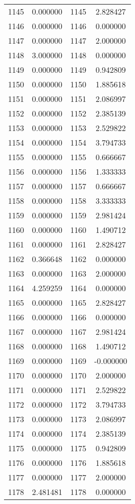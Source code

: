 \documentclass[12pt]{article}
\begin{document}
\begin{longtable}{@{}cccc@{}}
1145 & 0.000000 & 1145 & 2.828427 \\
1146 & 0.000000 & 1146 & 0.000000 \\
1147 & 0.000000 & 1147 & 2.000000 \\
1148 & 3.000000 & 1148 & 0.000000 \\
1149 & 0.000000 & 1149 & 0.942809 \\
1150 & 0.000000 & 1150 & 1.885618 \\
1151 & 0.000000 & 1151 & 2.086997 \\
1152 & 0.000000 & 1152 & 2.385139 \\
1153 & 0.000000 & 1153 & 2.529822 \\
1154 & 0.000000 & 1154 & 3.794733 \\
1155 & 0.000000 & 1155 & 0.666667 \\
1156 & 0.000000 & 1156 & 1.333333 \\
1157 & 0.000000 & 1157 & 0.666667 \\
1158 & 0.000000 & 1158 & 3.333333 \\
1159 & 0.000000 & 1159 & 2.981424 \\
1160 & 0.000000 & 1160 & 1.490712 \\
1161 & 0.000000 & 1161 & 2.828427 \\
1162 & 0.366648 & 1162 & 0.000000 \\
1163 & 0.000000 & 1163 & 2.000000 \\
1164 & 4.259259 & 1164 & 0.000000 \\
1165 & 0.000000 & 1165 & 2.828427 \\
1166 & 0.000000 & 1166 & 0.000000 \\
1167 & 0.000000 & 1167 & 2.981424 \\
1168 & 0.000000 & 1168 & 1.490712 \\
1169 & 0.000000 & 1169 & -0.000000 \\
1170 & 0.000000 & 1170 & 2.000000 \\
1171 & 0.000000 & 1171 & 2.529822 \\
1172 & 0.000000 & 1172 & 3.794733 \\
1173 & 0.000000 & 1173 & 2.086997 \\
1174 & 0.000000 & 1174 & 2.385139 \\
1175 & 0.000000 & 1175 & 0.942809 \\
1176 & 0.000000 & 1176 & 1.885618 \\
1177 & 0.000000 & 1177 & 2.000000 \\
1178 & 2.481481 & 1178 & 0.000000 \\

\end{longtable}
\end{document}

